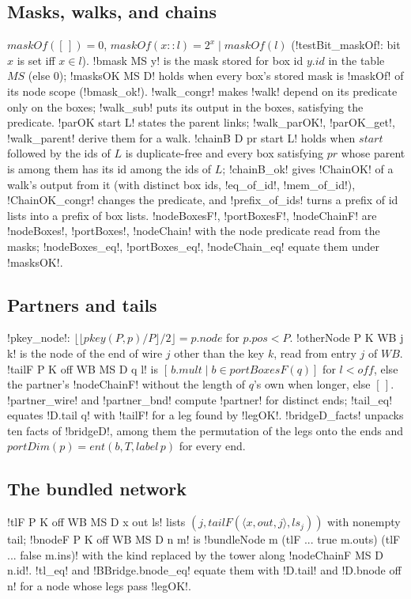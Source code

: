 {\subsection{Masks, walks, and chains}
$\mathit{maskOf}([\,])=0$, $\mathit{maskOf}(x::l)=2^x\mathbin{|}\mathit{maskOf}(l)$ (\lbx!testBit_maskOf!: bit $x$ is set iff $x\in l$). \lbx!bmask MS y! is the mask stored for box id $y.\mathit{id}$ in the table $\mathit{MS}$ (else $0$); \lbx!masksOK MS D! holds when every box's stored mask is \lbx!maskOf! of its node scope (\lbx!bmask_ok!). \lbx!walk_congr! makes \lbx!walk! depend on its predicate only on the boxes; \lbx!walk_sub! puts its output in the boxes, satisfying the predicate. \lbx!parOK start L! states the parent links; \lbx!walk_parOK!, \lbx!parOK_get!, \lbx!walk_parent! derive them for a walk. \lbx!chainB D pr start L! holds when $\mathit{start}$ followed by the ids of $L$ is duplicate-free and every box satisfying $pr$ whose parent is among them has its id among the ids of $L$; \lbx!chainB_ok! gives \lbx!ChainOK! of a walk's output from it (with distinct box ids, \lbx!eq_of_id!, \lbx!mem_of_id!), \lbx!ChainOK_congr! changes the predicate, and \lbx!prefix_of_ids! turns a prefix of id lists into a prefix of box lists. \lbx!nodeBoxesF!, \lbx!portBoxesF!, \lbx!nodeChainF! are \lbx!nodeBoxes!, \lbx!portBoxes!, \lbx!nodeChain! with the node predicate read from the masks; \lbx!nodeBoxes_eq!, \lbx!portBoxes_eq!, \lbx!nodeChain_eq! equate them under \lbx!masksOK!.

\subsection{Partners and tails}
\lbx!pkey_node!: $\lfloor\lfloor\mathit{pkey}(P,p)/P\rfloor/2\rfloor=p.\mathit{node}$ for $p.\mathit{pos}<P$. \lbx!otherNode P K WB j k! is the node of the end of wire $j$ other than the key $k$, read from entry $j$ of $\mathit{WB}$. \lbx!tailF P K off WB MS D q l! is $[\,b.\mathit{mult}\mid b\in\mathit{portBoxesF}(q)]$ for $l<\mathit{off}$, else the partner's \lbx!nodeChainF! without the length of $q$'s own when longer, else $[\,]$. \lbx!partner_wire! and \lbx!partner_bnd! compute \lbx!partner! for distinct ends; \lbx!tail_eq! equates \lbx!D.tail q! with \lbx!tailF! for a leg found by \lbx!legOK!. \lbx!bridgeD_facts! unpacks ten facts of \lbx!bridgeD!, among them the permutation of the legs onto the ends and $\mathit{portDim}(p)=\mathit{ent}(b,T,\mathit{label}\,p)$ for every end.

\subsection{The bundled network}
\lbx!tlF P K off WB MS D x out ls! lists $(j,\mathit{tailF}(\langle x,\mathit{out},j\rangle,ls_j))$ with nonempty tail; \lbx!bnodeF P K off WB MS D n m! is \lbx!bundleNode m (tlF ... true m.outs) (tlF ... false m.ins)! with the kind replaced by the tower along \lbx!nodeChainF MS D n.id!. \lbx!tl_eq! and \lbx!BBridge.bnode_eq! equate them with \lbx!D.tail! and \lbx!D.bnode off n! for a node whose legs pass \lbx!legOK!.

}
